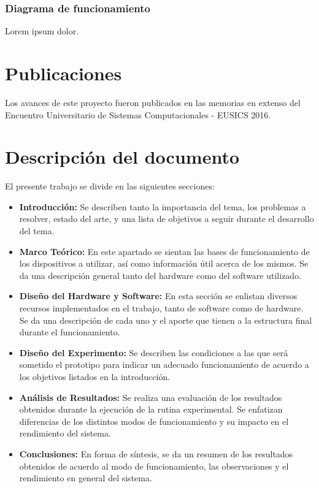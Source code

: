 
\subsubsection{Diagrama de funcionamiento}

Lorem ipsum dolor.

\section{Publicaciones}

Los avances de este proyecto fueron publicados en las memorias en extenso del Encuentro Universitario de Sistemas Computacionales - EUSICS 2016.

\section{Descripción del documento}

El presente trabajo se divide en las siguientes secciones: 

\begin{itemize}
\item \textbf{Introducción:} Se describen tanto la importancia del tema, los problemas a resolver, estado del arte, y una lista de objetivos a seguir durante el desarrollo del tema.\\
\item \textbf{Marco Teórico:} En este apartado se sientan las bases de funcionamiento de los dispositivos a utilizar, así como información útil acerca de los mismos. Se da una descripción general tanto del hardware como del software utilizado.\\
\item \textbf{Diseño del Hardware y Software:} En esta sección se enlistan diversos recursos implementados en el trabajo, tanto de software como de hardware. Se da una descripción de cada uno y el aporte que tienen a la estructura final durante el funcionamiento.\\
\item \textbf{Diseño del Experimento:} Se describen las condiciones a las que será sometido el prototipo para indicar un adecuado funcionamiento de acuerdo a los objetivos listados en la introducción.\\
\item \textbf{Análisis de Resultados:} Se realiza una evaluación de los resultados obtenidos durante la ejecución de la rutina experimental. Se enfatizan diferencias de los distintos modos de funcionamiento y su impacto en el rendimiento del sistema.\\
\item \textbf{Conclusiones:} En forma de síntesis, se da un resumen de los resultados obtenidos de acuerdo al modo de funcionamiento, las observaciones  y el rendimiento en general del sistema.\\
\end{itemize}

